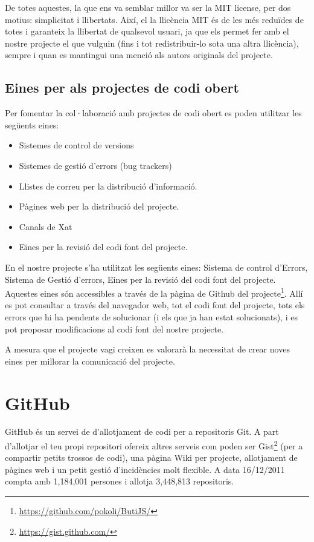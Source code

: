 De totes aquestes, la que ens va semblar millor va ser la MIT license, per dos motius: simplicitat i llibertats. Així, el la llicència MIT és de les més reduïdes de totes i garanteix la llibertat de qualsevol usuari, ja que els permet fer amb el nostre projecte el que vulguin (fins i tot redistribuir-lo sota una altra llicència), sempre i quan es mantingui una menció als autors originals del projecte. 

\subsection{Eines per als projectes de codi obert}

Per fomentar la col·laboració amb projectes de codi obert es poden utilitzar les següents eines: 

\begin{itemize}
\item{Sistemes de control de versions}
\item{Sistemes de gestió d'errors (bug trackers)}
\item{Llistes de correu per la distribució d'informació.}
\item{Pàgines web per la distribució del projecte.}
\item{Canals de Xat}
\item{Eines per la revisió del codi font del projecte.}
\end{itemize}

En el nostre projecte s'ha utilitzat les següents eines: Sistema de control d'Errors, Sistema de Gestió d'errors, Eines per la revisió del codi font del projecte. Aquestes eines són accessibles a través de la pàgina de Github del projecte\footnote{\url{https://github.com/pokoli/ButiJS/}}. Allí es pot consultar a través del navegador web, tot el codi font del projecte, tots els errors que hi ha pendents de solucionar (i els que ja han estat solucionats), i es pot proposar modificacions al codi font del nostre projecte. 

A mesura que el projecte vagi creixen es valorarà la necessitat de crear noves eines per millorar la comunicació del projecte. 

\section{GitHub}

GitHub és un servei de d'allotjament de codi per a repositoris Git. A part d'allotjar el teu propi repositori ofereix altres serveis com poden ser Gist\footnote{\url{https://gist.github.com/}} (per a compartir petits trossos de codi), una pàgina Wiki per projecte, allotjament de pàgines web i un petit gestió d'incidències molt flexible. A data 16/12/2011 compta amb 1,184,001 persones i allotja 3,448,813 repositoris.

